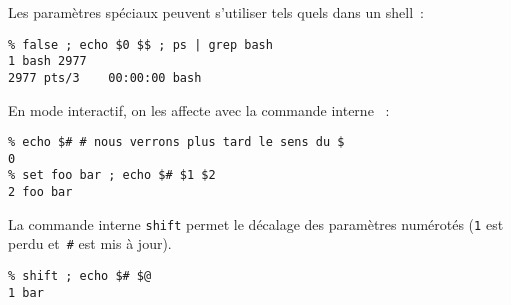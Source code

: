 \begin{frame}[fragile]
  Les param\`etres sp\'eciaux peuvent s'utiliser tels quels dans un
  shell~:
\begin{verbatim}
% false ; echo $0 $$ ; ps | grep bash
1 bash 2977
2977 pts/3    00:00:00 bash
\end{verbatim}
  En mode interactif, on les affecte avec la commande interne
  ~:
\begin{verbatim}
% echo $# # nous verrons plus tard le sens du $
0
% set foo bar ; echo $# $1 $2
2 foo bar
\end{verbatim}
  La commande interne \verb|shift| permet le d\'ecalage des
  param\`etres num\'erot\'es (\verb|1| est perdu et~\verb+#+ est mis
  \`a jour).
\begin{verbatim}
% shift ; echo $# $@
1 bar
\end{verbatim}
\end{frame}
